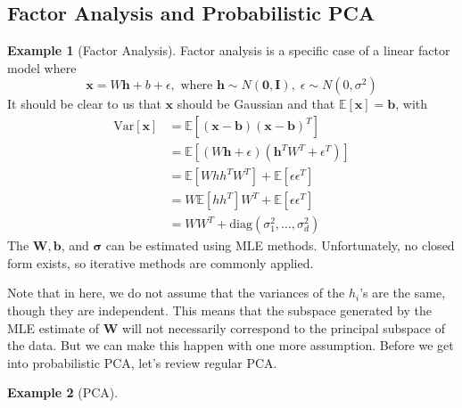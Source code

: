 \documentclass{article}
\theoremstyle{definition}
\newtheorem{example}{Example}[section]
\theoremstyle{remark}
\theoremstyle{definition}
\begin{document}
      \subsection{Factor Analysis and Probabilistic PCA}

        \begin{example}[Factor Analysis] 
        Factor analysis is a specific case of a linear factor model where 
        \[\mathbf{x} = W \mathbf{h} + b + \epsilon, \text{ where } \mathbf{h} \sim N(\mathbf{0}, \mathbf{I}), \; \epsilon \sim N(0, \sigma^2)\] 
        It should be clear to us that $\mathbf{x}$ should be Gaussian and that $\mathbb{E}[\mathbf{x}] = \mathbf{b}$, with 
        \begin{align*} 
            \mathrm{Var}[\mathbf{x}] & = \mathbb{E}[ (\mathbf{x} - \mathbf{b})( \mathbf{x} - \mathbf{b})^T ] \\
                                     & = \mathbb{E}[ (W \mathbf{h} + \epsilon) (\mathbf{h}^T W^T + \epsilon^T)] \\
                                     & = \mathbb{E}[W h h^T W^T] + \mathbb{E}[ \epsilon \epsilon^T] \\
                                     & = W \mathbb{E}[ h h^T] W^T + \mathbb{E}[ \epsilon \epsilon^T] \\
                                     & = W W^T + \mathrm{diag}(\sigma_1^2, \ldots, \sigma_d^2) 
        \end{align*} 
        The $\mathbf{W}, \mathbf{b}$, and $\boldsymbol{\sigma}$ can be estimated using MLE methods. Unfortunately, no closed form  exists, so iterative methods are commonly applied. 
        \end{example} 

        Note that in here, we do not assume that the variances of the $h_i$'s are the same, though they are independent. This means that the subspace generated by the MLE estimate of $\mathbf{W}$ will not necessarily correspond to the principal subspace of the data. But we can make this happen with one more assumption. Before we get into probabilistic PCA, let's review regular PCA. 

        \begin{example}[PCA] 
            
        \end{example} 
\end{document}
